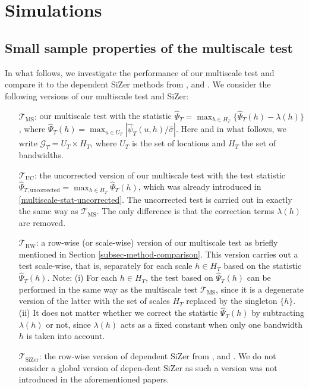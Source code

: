 
\section{Simulations}\label{sec-sim}


\subsection{Small sample properties of the multiscale test}\label{subsec-sim-multiscale}


In what follows, we investigate the performance of our multiscale test and compare it to the dependent SiZer methods from \cite{Rondonotti2004}, \cite{Rondonotti2007} and \cite{ParkHannigKang2009}. We consider the following versions of our multiscale test and SiZer:
\begin{itemize}[leftmargin=1.25cm]

\item[$\mathcal{T}_{\text{MS}}$:] our multiscale test with the statistic $\widehat{\Psi}_T = \max_{h \in H_T} \{ \widehat{\Psi}_T(h) - \lambda(h) \}$, where $\widehat{\Psi}_T(h) = \max_{u \in U_T} |\widehat{\psi}_T(u,h) / \widehat{\sigma}|$. Here and in what follows, we write $\mathcal{G}_T = U_T \times H_T$, where $U_T$ is the set of locations and $H_T$ the set of bandwidths.  

\item[$\mathcal{T}_{\text{UC}}$:] the uncorrected version of our multiscale test with the test statistic $\widehat{\Psi}_{T,\text{uncorrected}} = \max_{h \in H_T} \widehat{\Psi}_T(h)$, which was already introduced in \eqref{multiscale-stat-uncorrected}. The uncorrected test is carried out in exactly the same way as $\mathcal{T}_{\text{MS}}$. The only difference is that the correction terms $\lambda(h)$ are removed. 

\item[$\mathcal{T}_{\text{RW}}$:] a row-wise (or scale-wise) version of our multiscale test as briefly mentioned in Section \ref{subsec-method-comparison}. This version carries out a test scale-wise, that is, separately for each scale $h \in H_T$ based on the statistic $\widehat{\Psi}_T(h)$. Note: (i) For each $h \in H_T$, the test based on $\widehat{\Psi}_T(h)$ can be performed in the same way as the multiscale test $\mathcal{T}_{\text{MS}}$, since it is a degenerate version of the latter with the set of scales $H_T$ replaced by the singleton $\{h\}$. (ii) It does not matter whether we correct the statistic $\widehat{\Psi}_T(h)$ by subtracting $\lambda(h)$ or not, since $\lambda(h)$ acts as a fixed constant when only one bandwidth $h$ is taken into account. 

\item[$\mathcal{T}_{\text{SiZer}}$:] the row-wise version of dependent SiZer from \cite{Rondonotti2004}, \cite{Rondonotti2007} and \cite{ParkHannigKang2009}. We do not consider a global version of depen-\linebreak dent SiZer as such a version was not introduced in the aforementioned papers. 

\end{itemize}


